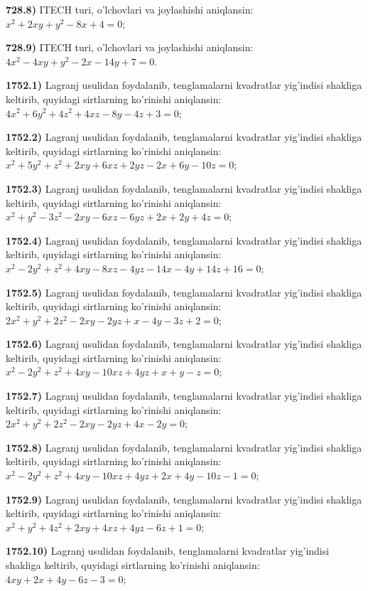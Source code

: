 \textbf{728.8)} ITECH turi, o'lchovlari va joylashishi aniqlansin: $x^{2} + 2xy + y^{2} - 8x + 4 = 0$;

\textbf{728.9)} ITECH turi, o'lchovlari va joylashishi aniqlansin: $4x^{2} - 4xy + y^{2} - 2x - 14y + 7 = 0$.

\textbf{1752.1)} Lagranj usulidan foydalanib, tenglamalarni kvadratlar yig'indisi shakliga keltirib, quyidagi sirtlarning ko'rinishi aniqlansin: $4x^{2} + 6y^{2} + 4z^{2} + 4xz - 8y - 4z + 3 = 0$;

\textbf{1752.2)} Lagranj usulidan foydalanib, tenglamalarni kvadratlar yig'indisi shakliga keltirib, quyidagi sirtlarning ko'rinishi aniqlansin: $x^{2} + 5y^{2} + z^{2} + 2xy + 6xz + 2yz - 2x + 6y - 10z = 0$;

\textbf{1752.3)} Lagranj usulidan foydalanib, tenglamalarni kvadratlar yig'indisi shakliga keltirib, quyidagi sirtlarning ko'rinishi aniqlansin: $x^{2} + y^{2} - 3z^{2} - 2xy - 6xz - 6yz + 2x + 2y + 4z = 0$;

\textbf{1752.4)} Lagranj usulidan foydalanib, tenglamalarni kvadratlar yig'indisi shakliga keltirib, quyidagi sirtlarning ko'rinishi aniqlansin: $x^{2} - 2y^{2} + z^{2} + 4xy - 8xz - 4yz - 14x - 4y + 14z + 16 = 0$;

\textbf{1752.5)} Lagranj usulidan foydalanib, tenglamalarni kvadratlar yig'indisi shakliga keltirib, quyidagi sirtlarning ko'rinishi aniqlansin: $2x^{2} + y^{2} + 2z^{2} - 2xy - 2yz + x - 4y - 3z + 2 = 0$;

\textbf{1752.6)} Lagranj usulidan foydalanib, tenglamalarni kvadratlar yig'indisi shakliga keltirib, quyidagi sirtlarning ko'rinishi aniqlansin: $x^{2} - 2y^{2} + z^{2} + 4xy - 10xz + 4yz + x + y - z = 0$;

\textbf{1752.7)} Lagranj usulidan foydalanib, tenglamalarni kvadratlar yig'indisi shakliga keltirib, quyidagi sirtlarning ko'rinishi aniqlansin: $2x^{2} + y^{2} + 2z^{2} - 2xy - 2yz + 4x - 2y = 0$;

\textbf{1752.8)} Lagranj usulidan foydalanib, tenglamalarni kvadratlar yig'indisi shakliga keltirib, quyidagi sirtlarning ko'rinishi aniqlansin: $x^{2} - 2y^{2} + z^{2} + 4xy - 10xz + 4yz + 2x + 4y - 10z - 1 = 0$;

\textbf{1752.9)} Lagranj usulidan foydalanib, tenglamalarni kvadratlar yig'indisi shakliga keltirib, quyidagi sirtlarning ko'rinishi aniqlansin: $x^{2} + y^{2} + 4z^{2} + 2xy + 4xz + 4yz - 6z + 1 = 0$;

\textbf{1752.10)} Lagranj usulidan foydalanib, tenglamalarni kvadratlar yig'indisi shakliga keltirib, quyidagi sirtlarning ko'rinishi aniqlansin: $4xy + 2x + 4y - 6z - 3 = 0$;

